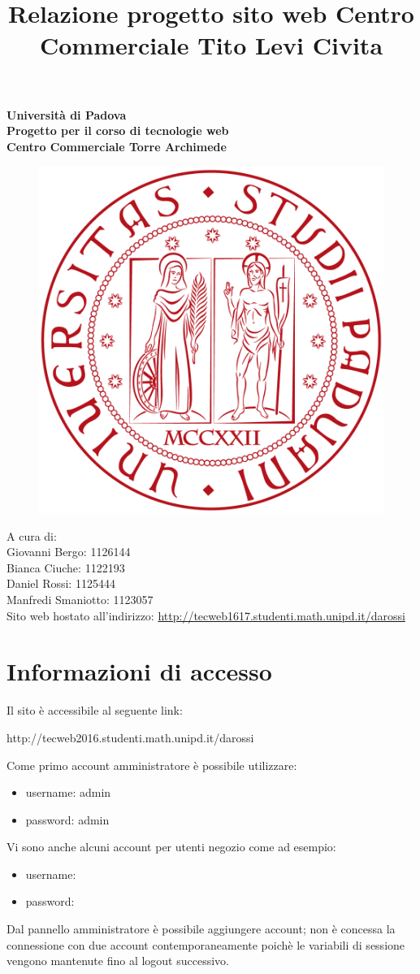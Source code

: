 \documentclass[a4paper,12pt]{article}
\begin{document}
\title{Relazione progetto sito web Centro Commerciale Tito Levi Civita}
\begin{titlepage}
	\pagestyle{empty}
	\centering
	\vfill
	{
		\bfseries
		\vskip2cm
		\Large Università di Padova\\
		\vfill
		\Large Progetto per il corso di tecnologie web\\
		\Huge Centro Commerciale Torre Archimede\\
		\vfill
		
		\begin{figure}
			\centering
			\includegraphics[width=0.6\linewidth]{images/LogoPadova}
		\end{figure}
		A cura di:\\
		\Large Giovanni Bergo:		1126144\\ Bianca Ciuche:		1122193 \\Daniel Rossi:		1125444\\ Manfredi Smaniotto:	1123057\\
		\vfill
		Sito web hostato all'indirizzo: \url{http://tecweb1617.studenti.math.unipd.it/darossi}\\
		\vfill
	}
\end{titlepage}
\tableofcontents
\pagestyle{empty}
\newpage
\pagestyle{fancy}
\fancyhead[RE,LO]{}
\fancyfoot[CE,CO]{}
\section{Informazioni di accesso}
Il sito è accessibile al seguente link:
\begin{center}
	http://tecweb2016.studenti.math.unipd.it/darossi
\end{center}
Come primo account amministratore è possibile utilizzare:
\begin{itemize}
	\item username: admin
	\item password: admin
\end{itemize}
Vi sono anche alcuni account per utenti negozio come ad esempio:
\begin{itemize}
	\item username:
	\item password:
\end{itemize}
Dal pannello amministratore è possibile aggiungere account; non è concessa la connessione con due account contemporaneamente poichè le variabili di sessione vengono mantenute fino al logout successivo.
\end{document}
